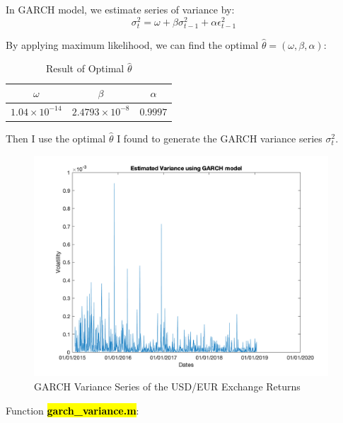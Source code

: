 \documentclass{report}
\begin{document}
In GARCH model, we estimate series of variance by:
\begin{equation}
	\sigma_t^2=\omega+\beta \sigma^2_{t-1}+\alpha \epsilon_{t-1}^2
\end{equation}

By applying maximum likelihood, we can find the optimal $\hat{\theta}=(\omega, \beta,\alpha)$:

\begin{table}[H]
	\begin{center}
		\caption{Result of Optimal $\hat{\theta}$}
		\label{tab:table7}
		\vspace{2mm}
		\begin{tabular}{c|c|c} 
			
			\textbf{$\omega$} & \textbf{$\beta$}& \textbf{$\alpha$} \\
			\hline
			
			$1.04\times 10^{-14}$ &$2.4793\times 10^{-8}$ & $0.9997$  
		\end{tabular}
	\end{center}
\end{table}

Then I use the optimal $\hat{\theta}$ I found to generate the GARCH variance series $\sigma_t^2$.

\begin{figure}[H]
	\centering
	\includegraphics[width = 11cm]{fig/4}
	\caption{GARCH Variance Series of the USD/EUR Exchange Returns } 
\end{figure}






Function \hl{\textbf{garch\_variance.m}}:

\end{document}
